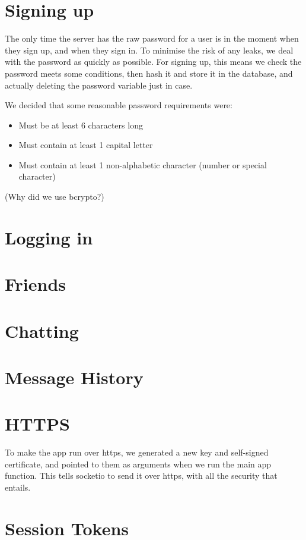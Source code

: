\documentclass[12pt]{article}
\begin{document}

\section{Signing up}

The only time the server has the raw password for a user is in the moment when they sign up, and when they sign in. To minimise the risk of any leaks, we deal with the password as quickly as possible. For signing up, this means we check the password meets some conditions, then hash it and store it in the database, and actually deleting the password variable just in case.

We decided that some reasonable password requirements were:

\begin{itemize}
    \item Must be at least 6 characters long
    \item Must contain at least 1 capital letter
    \item Must contain at least 1 non-alphabetic character (number or special character)
\end{itemize}

(Why did we use bcrypto?)

\section{Logging in}
\section{Friends}
\section{Chatting}
\section{Message History}
\section{HTTPS}

To make the app run over https, we generated a new key and self-signed certificate, and pointed to them as arguments when we run the main app function. This tells socketio to send it over https, with all the security that entails.

\section{Session Tokens}
\end{document}
